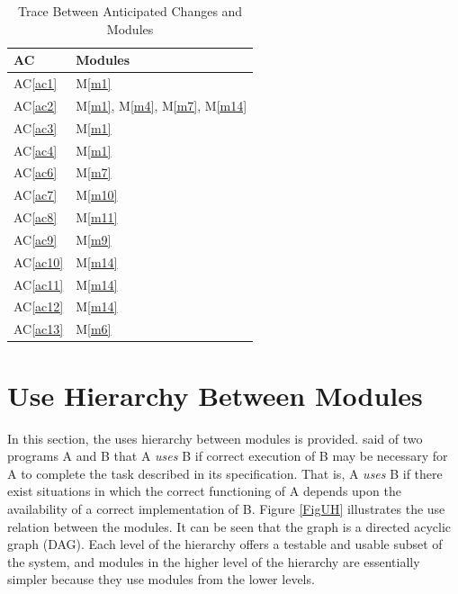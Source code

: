 \documentclass[12pt, titlepage]{article}
\newcommand{\acref}[1]{AC\ref{#1}}
\newcommand{\mref}[1]{M\ref{#1}}
\begin{document}
\begin{table}[H]
	\centering
	\begin{tabular}{p{} p{}}
		\toprule
		\textbf{AC} & \textbf{Modules}\\
		\midrule
		\acref{ac1} & \mref{m1}\\
		\acref{ac2} & \mref{m1}, \mref{m4}, \mref{m7}, \mref{m14}\\
		\acref{ac3} & \mref{m1}\\
		\acref{ac4} & \mref{m1}\\
		\acref{ac6} & \mref{m7}\\
		\acref{ac7} & \mref{m10}\\
		\acref{ac8} & \mref{m11}\\
		\acref{ac9} & \mref{m9}\\
		\acref{ac10} & \mref{m14}\\
		\acref{ac11} & \mref{m14}\\
		\acref{ac12} & \mref{m14}\\
		\acref{ac13} & \mref{m6}\\
		\bottomrule
	\end{tabular}
	\caption{Trace Between Anticipated Changes and Modules}
	\label{TblACT}
\end{table}

\section{Use Hierarchy Between Modules} \label{SecUse}

In this section, the uses hierarchy between modules is
provided. \citet{Parnas1978} said of two programs A and B that A {\em uses} B if
correct execution of B may be necessary for A to complete the task described in
its specification. That is, A {\em uses} B if there exist situations in which
the correct functioning of A depends upon the availability of a correct
implementation of B.  Figure \ref{FigUH} illustrates the use relation between
the modules. It can be seen that the graph is a directed acyclic graph
(DAG). Each level of the hierarchy offers a testable and usable subset of the
system, and modules in the higher level of the hierarchy are essentially simpler
because they use modules from the lower levels.
\end{document}
